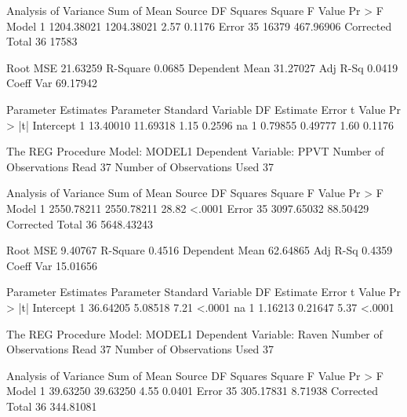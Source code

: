 \documentclass{article}
\begin{document}
\begin{Woutput}
                             Analysis of Variance
                                    Sum of           Mean
Source                   DF        Squares         Square    F Value    Pr > F
Model                     1     1204.38021     1204.38021       2.57    0.1176
Error                    35          16379      467.96906
Corrected Total          36          17583

Root MSE             21.63259    R-Square     0.0685
Dependent Mean       31.27027    Adj R-Sq     0.0419
Coeff Var            69.17942

                        Parameter Estimates
                     Parameter       Standard
Variable     DF       Estimate          Error    t Value    Pr > |t|
Intercept     1       13.40010       11.69318       1.15      0.2596
na            1        0.79855        0.49777       1.60      0.1176

The REG Procedure
Model: MODEL1
Dependent Variable: PPVT
Number of Observations Read          37
Number of Observations Used          37

                             Analysis of Variance
                                    Sum of           Mean
Source                   DF        Squares         Square    F Value    Pr > F
Model                     1     2550.78211     2550.78211      28.82    <.0001
Error                    35     3097.65032       88.50429
Corrected Total          36     5648.43243

Root MSE              9.40767    R-Square     0.4516
Dependent Mean       62.64865    Adj R-Sq     0.4359
Coeff Var            15.01656

                        Parameter Estimates
                     Parameter       Standard
Variable     DF       Estimate          Error    t Value    Pr > |t|
Intercept     1       36.64205        5.08518       7.21      <.0001
na            1        1.16213        0.21647       5.37      <.0001

The REG Procedure
Model: MODEL1
Dependent Variable: Raven
Number of Observations Read          37
Number of Observations Used          37

                             Analysis of Variance
                                    Sum of           Mean
Source                   DF        Squares         Square    F Value    Pr > F
Model                     1       39.63250       39.63250       4.55    0.0401
Error                    35      305.17831        8.71938
Corrected Total          36      344.81081


\end{Woutput}
\end{document}
